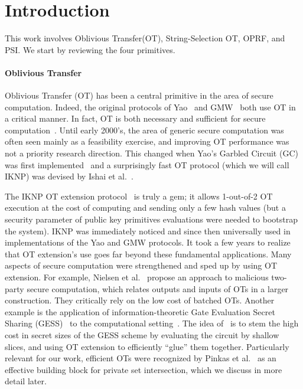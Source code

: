 
\section{Introduction}
\label{sect:intro}

This work involves Oblivious Transfer(OT), String-Selection OT, OPRF, and PSI.  We start by reviewing the four primitives.

\paragraph{Oblivious Transfer}

Oblivious Transfer (OT) has been a central primitive in the area of secure computation.  Indeed, the original protocols of Yao~\cite{FOCS:Yao86} and GMW~\cite{GoldreichBook2,STOC:GolMicWig87} both use OT in a critical manner.  In fact, OT is both necessary and sufficient for secure computation~\cite{STOC:Kilian88}.  Until early 2000's, the area of generic secure computation was often seen mainly as a feasibility exercise, and improving  OT performance was not a priority research direction.  This changed when Yao's Garbled Circuit (GC) was first implemented~\cite{Fairplay} and a surprisingly fast OT protocol (which we will call IKNP) was devised by Ishai et al.~\cite{C:IKNP03}.

The IKNP OT extension protocol~\cite{C:IKNP03} is truly a gem; it allows 1-out-of-2 OT execution at the cost of computing and sending only a few hash values (but a security parameter of public key primitives evaluations were needed to bootstrap the system).  IKNP was immediately noticed and since then universally used in implementations of the Yao and GMW protocols. It took a few years to realize that OT extension's use goes far beyond these fundamental applications.  Many aspects of secure computation were strengthened  and sped up by using OT extension.  For example, Nielsen et al.~\cite{C:NNOB12} propose  an approach to malicious  two-party secure computation, which relates outputs and inputs of OTs in a larger construction.  They critically rely on the low cost of batched OTs.
Another example is the application of information-theoretic Gate Evaluation Secret Sharing (GESS)~\cite{AC:Kolesnikov05} to the computational setting~\cite{SCN:KolKum12}.  The idea of~\cite{SCN:KolKum12} is to stem the high cost in secret sizes of the GESS scheme by evaluating the circuit by shallow slices, and using OT extension to efficiently ``glue'' them together. Particularly relevant for our work, efficient OTs were recognized by Pinkas et al.~\cite{DBLP:conf/uss/Pinkas0Z14} as an effective building block for private set intersection, which we discuss in more detail later.

